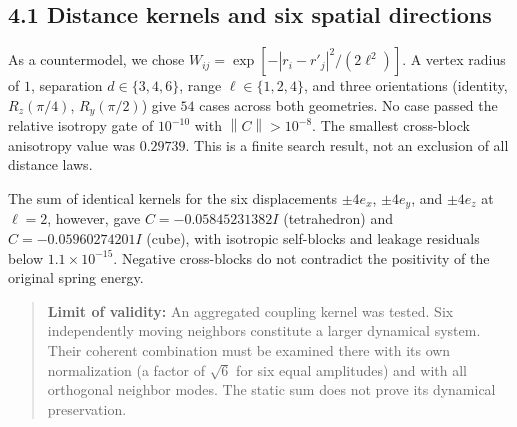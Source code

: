 \documentclass[a4paper,11pt]{article}
\newcommand{\norm}[1]{\left\lVert#1\right\rVert}
\begin{document}
\subsection*{4.1 Distance kernels and six spatial directions}
As a countermodel, we chose $W_{ij}=\exp[-|r_i-r'_j|^2/(2\ell^2)]$. A vertex radius of $1$, separation $d\in\{3,4,6\}$, range $\ell\in\{1,2,4\}$, and three orientations (identity, $R_z(\pi/4)$, $R_y(\pi/2)$) give $54$ cases across both geometries. No case passed the relative isotropy gate of $10^{-10}$ with $\norm C>10^{-8}$. The smallest cross-block anisotropy value was $0.29739$. This is a finite search result, not an exclusion of all distance laws.

The sum of identical kernels for the six displacements $\pm4e_x$, $\pm4e_y$, and $\pm4e_z$ at $\ell=2$, however, gave $C=-0.05845231382I$ (tetrahedron) and $C=-0.05960274201I$ (cube), with isotropic self-blocks and leakage residuals below $1.1\times10^{-15}$. Negative cross-blocks do not contradict the positivity of the original spring energy.

\begin{quote}
\textbf{Limit of validity:} An aggregated coupling kernel was tested. Six independently moving neighbors constitute a larger dynamical system. Their coherent combination must be examined there with its own normalization (a factor of $\sqrt6$ for six equal amplitudes) and with all orthogonal neighbor modes. The static sum does not prove its dynamical preservation.
\end{quote}
\end{document}
